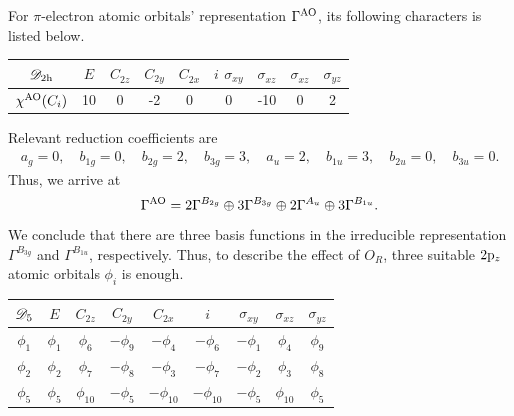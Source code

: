 		For $\pi$-electron atomic orbitals' representation $\Gamma^{\rm AO}$, its following characters is listed below.		
		\begin{center}
		\setlength{\abovecaptionskip}{-0.3em}
		\begin{tabular}{ccccccccc}\hline
	$\mathscr{D}_{\rm 2h}$	& $E$ & $C_{2z}$ &	$C_{2y}$	& $C_{2x}$	&	$i$	$\sigma_{xy}$	&	$\sigma_{xz}$	&	$\sigma_{xz}$ &	$\sigma_{yz}$  \\ \hline
	$\chi^{{\rm AO}}(C_i)$	&	10	&	0	&	-2	&	0	&	0	&	-10	&	0	&	2	\\ \hline
		\end{tabular}\vspace*{-0.5em}
		\end{center}
		Relevant reduction coefficients are
		\begin{align*}
			a_g = 0,	\quad	b_{1g} = 0,	\quad	b_{2g} = 2,	\quad	b_{3g} = 3,	\quad a_u = 2,	\quad b_{1u} = 3,	\quad	b_{2u} = 0,	\quad	b_{3u} = 0.
		\end{align*}
		Thus, we arrive at
		\begin{equation*}
			\Gamma^{{\rm AO}} = 2\Gamma^{B_{2g}} \oplus 3\Gamma^{B_{3g}} \oplus 2\Gamma^{A_u} \oplus 3\Gamma^{B_{1u}}.
		\end{equation*}
		We conclude that there are three basis functions in the irreducible representation $\Gamma^{B_{3g}}$ and $\Gamma^{B_{1u}}$, respectively. Thus, to describe the effect of $O_R$, three suitable $2 {\rm p}_z$ atomic orbitals $\phi_i$ is enough.
		
		\begin{center}
		\setlength{\abovecaptionskip}{0em}
		\begin{tabular}{ccccccccc}\hline
	$\mathscr{D}_{\rm 5}$ & $E$ & $C_{2z}$ & $C_{2y}$ & $C_{2x}$	&	$i$	&	$\sigma_{xy}$ &	$\sigma_{xz}$	&	$\sigma_{yz}$\\ \hline
			$\phi_1$	&	$\phi_1$	&	$\phi_6$	&	$-\phi_9$	&	$-\phi_4$	&	$-\phi_6$	&	$-\phi_1$	&	$\phi_4$	&	$\phi_9$		\\
			$\phi_2$	&	$\phi_2$	&	$\phi_7$	&	$-\phi_8$	&	$-\phi_3$	&	$-\phi_7$	&	$-\phi_2$	&	$\phi_3$	&	$\phi_8$		\\ 
			$\phi_5$	&	$\phi_5$	&	$\phi_{10}$	&	$-\phi_5$	&	$-\phi_{10}$	&	$-\phi_{10}$	&	$-\phi_5$	&	$\phi_{10}$	&	$\phi_5$		\\\hline
		\end{tabular}
		\end{center}
		
